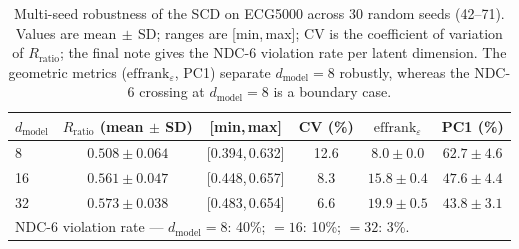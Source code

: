 %
%
%
\begin{table}[ht]
  \centering
  \caption{Multi-seed robustness of the SCD on ECG5000 across 30 random
    seeds (42--71). Values are mean$\,\pm\,$SD; ranges are [min,\,max];
    CV is the coefficient of variation of $R_{\mathrm{ratio}}$; the final
    note gives the NDC-6 violation rate per latent dimension. The
    geometric metrics ($\mathrm{effrank}_{\varepsilon}$, PC1) separate
    $d_{\mathrm{model}}=8$ robustly, whereas the NDC-6 crossing at
    $d_{\mathrm{model}}=8$ is a boundary case.}
  \label{tab:ecg_multiseed}
  \begin{tabular}{lccccc}
    \toprule
    $d_{\mathrm{model}}$ & $R_{\mathrm{ratio}}$ (mean$\,\pm\,$SD)
      & [min,\,max] & CV (\%) & $\mathrm{effrank}_{\varepsilon}$
      & PC1 (\%) \\
    \midrule
    \phantom{0}8  & $0.508 \pm 0.064$ & [0.394,\,0.632] & 12.6
      & $8.0 \pm 0.0$  & $62.7 \pm 4.6$ \\
    16            & $0.561 \pm 0.047$ & [0.448,\,0.657] & \phantom{0}8.3
      & $15.8 \pm 0.4$ & $47.6 \pm 4.4$ \\
    32            & $0.573 \pm 0.038$ & [0.483,\,0.654] & \phantom{0}6.6
      & $19.9 \pm 0.5$ & $43.8 \pm 3.1$ \\
    \midrule
    \multicolumn{6}{l}{\footnotesize NDC-6 violation rate ---
      $d_{\mathrm{model}}{=}8$: 40\%; ${=}16$: 10\%; ${=}32$: 3\%.}\\
    \bottomrule
  \end{tabular}
\end{table}

